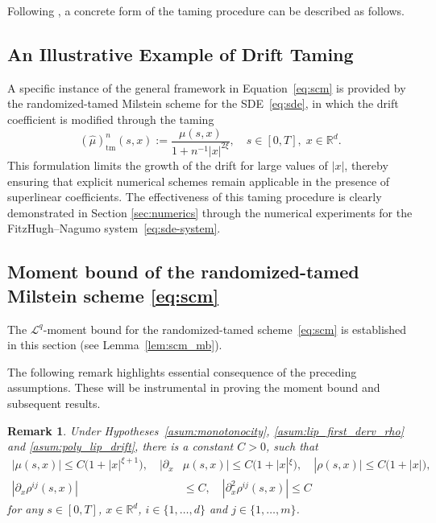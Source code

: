 \documentclass[reqno,  oneside, 12pt]{amsart}
\newtheorem{remark}{Remark}[section]
\begin{document}
Following \cite{Kumar2020}, a concrete form of the taming procedure can be described as follows.

\subsection{An Illustrative Example of Drift Taming}

A specific instance of the general framework in Equation~\eqref{eq:scm} is provided by the randomized-tamed Milstein scheme for the SDE~\eqref{eq:sde}, in which the drift coefficient is modified through the taming
\begin{equation} \label{eq:taming_drift}
	(\widehat{\mu})_{\mathrm{tm}}^{n}(s,x) := \frac{\mu(s,x)}{1 + n^{-1} |x|^{2\xi}}, \quad s \in [0,T], \; x \in \mathbb{R}^d.
\end{equation}
This formulation limits the growth of the drift for large values of $|x|$, thereby ensuring that explicit numerical schemes remain applicable in the presence of superlinear coefficients. The effectiveness of this taming procedure is clearly demonstrated in Section \ref{sec:numerics} through the numerical experiments for the FitzHugh--Nagumo system~\eqref{eq:sde-system}.





\subsection{Moment bound of the randomized-tamed Milstein scheme \eqref{eq:scm}} 
The $\mathscr{L}^q$-moment bound for the randomized-tamed scheme~\eqref{eq:scm} is established in this section (see Lemma~\ref{lem:scm_mb}). 


The following remark highlights essential consequence of the preceding assumptions.
These will be instrumental in proving the moment bound and subsequent results.

\begin{remark} \label{rem:super_linear}
	Under Hypotheses~\textnormal{\ref{asum:monotonocity}}, \textnormal{\ref{asum:lip_first_derv_rho}} and \textnormal{\ref{asum:poly_lip_drift}}, there is a constant \( C > 0 \), such that
	\begin{align*}
		|\mu(s,x)| \leq C \big(1 + |x|^{\xi + 1}\big), \quad
		|\partial_x &\mu(s,x)| \leq C \big(1 + |x|^{\xi}\big), \quad
		|\rho(s,x)| \leq C \big(1 + |x|\big), \\
		|\partial_x \rho^{ij}(s,x)| &\leq C, \quad
		|\partial_x^2 \rho^{ij}(s,x)| \leq C
	\end{align*}
	for any \( s\in [0,T] \), \( x \in \mathbb{R}^d \), $i\in\{1,\ldots,d\}$ and $j\in\{1,\ldots,m\}$.
\end{remark}
\end{document}
